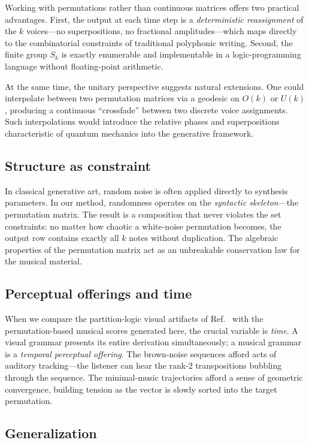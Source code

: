 \documentclass[
  twocolumn,
  aps,
  pra,
  showkeys,
  amsmath,amssymb,
  longbibliography
]{revtex4-2}
\begin{document}
Working with permutations rather than continuous matrices
offers two practical advantages.
First, the output at each time step is a \emph{deterministic
reassignment} of the $k$ voices---no superpositions, no
fractional amplitudes---which maps directly to the
combinatorial constraints of traditional polyphonic writing.
Second, the finite group $S_k$ is exactly enumerable and
implementable in a logic-programming language without
floating-point arithmetic.

At the same time, the unitary perspective suggests natural
extensions.
One could interpolate between two permutation matrices via a
geodesic on $O(k)$ or $U(k)$, producing a continuous
``crossfade'' between two discrete voice assignments.
Such interpolations would introduce the relative phases and
superpositions characteristic of quantum mechanics into the
generative framework.

\subsection{Structure as constraint}

In classical generative art, random noise is often applied
directly to synthesis parameters.
In our method, randomness operates on the \emph{syntactic
skeleton}---the permutation matrix.
The result is a composition that never violates the set
constraints: no matter how chaotic a white-noise permutation
becomes, the output row contains exactly all $k$ notes without
duplication.
The algebraic properties of the permutation matrix act as an
unbreakable conservation law for the musical material.

\subsection{Perceptual offerings and time}

When we compare the partition-logic visual artifacts of
Ref.~\cite{jendreiko-svozil-2026} with the permutation-based
musical scores generated here, the crucial variable is
\emph{time}.
A visual grammar presents its entire derivation
simultaneously; a musical grammar is a \emph{temporal
perceptual offering}.
The brown-noise sequences afford acts of auditory
tracking---the listener can hear the rank-2 transpositions
bubbling through the sequence.
The minimal-music trajectories afford a sense of geometric
convergence, building tension as the vector is slowly sorted
into the target permutation.

\subsection{Generalization}
\end{document}

